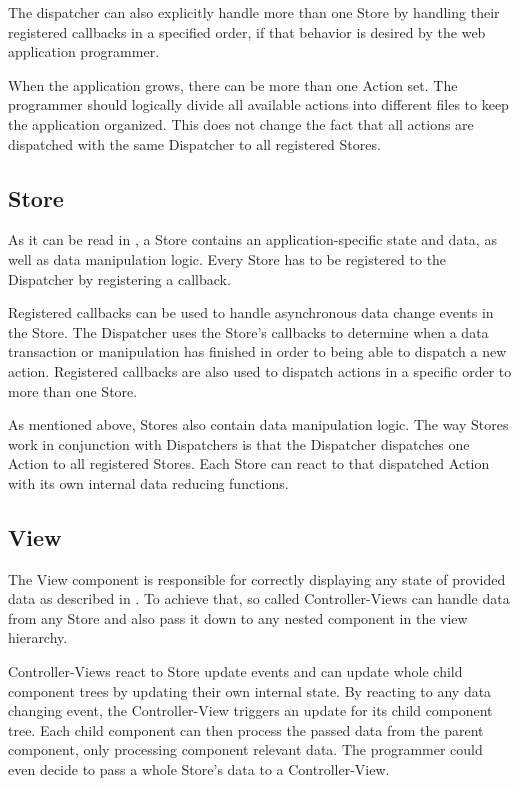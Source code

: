 The dispatcher can also explicitly handle more than one Store by handling their registered callbacks in a specified order, if that behavior is desired by the web application programmer.

When the application grows, there can be more than one Action set. The programmer should logically divide all available actions into different files to keep the application organized. This does not change the fact that all actions are dispatched with the same Dispatcher to all registered Stores. 

\subsection{Store}
\label{ssec:fluxstore}


As it can be read in \cite[structure-and-data-flow, Stores]{FacebookInc.2014}, a Store contains an application-specific state and data, as well as data manipulation logic. Every Store has to be registered to the Dispatcher by registering a callback. 

Registered callbacks can be used to handle asynchronous data change events in the Store. The Dispatcher uses the Store's callbacks to determine when a data transaction or manipulation has finished in order to being able to dispatch a new action. Registered callbacks are also used to dispatch actions in a specific order to more than one Store.

As mentioned above, Stores also contain data manipulation logic. The way Stores work in conjunction with Dispatchers is that the Dispatcher dispatches one Action to all registered Stores. Each Store can react to that dispatched Action with its own internal data reducing functions.

\subsection{View}

The View component is responsible for correctly displaying any state of provided data as described in \cite[views-and-controller-views]{FacebookInc.2014}. To achieve that, so called Controller-Views can handle data from any Store and also pass it down to any nested component in the view hierarchy.

Controller-Views react to Store update events and can update whole child component trees by updating their own internal state. By reacting to any data changing event, the Controller-View triggers an update for its child component tree. Each child component can then process the passed data from the parent component, only processing component relevant data. The programmer could even decide to pass a whole Store's data to a Controller-View.

